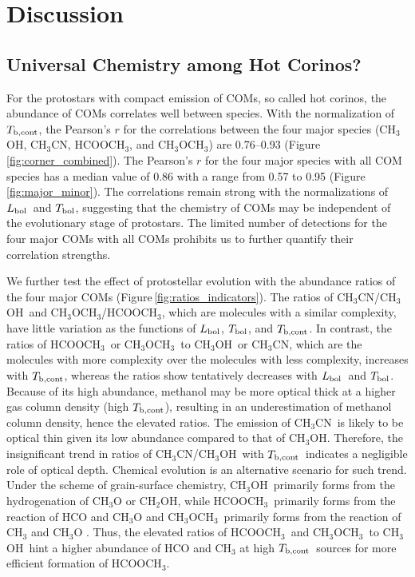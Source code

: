 \documentclass[twocolumn]{aastex62}
\newcommand{\lbol}{\mbox{$L_{\rm bol}$}}
\newcommand{\tbol}{\mbox{$T_{\rm bol}$}}
\newcommand{\tbc}{\mbox{$T_{\rm b, cont}$}}
\newcommand{\methylformate}{\mbox{HCOOCH$_{3}$}}
\newcommand{\methanol}{\mbox{CH$_{3}$OH}}
\newcommand{\dimethylether}{\mbox{CH$_{3}$OCH$_{3}$}}
\newcommand{\methylcyanide}{\mbox{CH$_{3}$CN}}
\begin{document}
\section{Discussion}
\label{sec:discussion}
\subsection{Universal Chemistry among Hot Corinos?}
For the protostars with compact emission of COMs, so called hot corinos, the abundance of COMs correlates well between species.  With the normalization of \tbc, the Pearson's $r$ for the correlations between the four major species (\methanol, \methylcyanide, \methylformate, and \dimethylether) are 0.76--0.93 (Figure\,\ref{fig:corner_combined}).  The Pearson's $r$ for the four major species with all COM species has a median value of 0.86 with a range from 0.57 to 0.95 (Figure\,\ref{fig:major_minor}).  The correlations remain strong with the normalizations of \lbol\ and \tbol, suggesting that the chemistry of COMs may be independent of the evolutionary stage of protostars.  The limited number of detections for the four major COMs with all COMs prohibits us to further quantify their correlation strengths.

We further test the effect of protostellar evolution with the abundance ratios of the four major COMs (Figure\,\ref{fig:ratios_indicators}).  The ratios of \methylcyanide/\methanol\ and \dimethylether/\methylformate, which are molecules with a similar complexity, have little variation as the functions of \lbol, \tbol, and \tbc.  In contrast, the ratios of \methylformate\ or \dimethylether\ to \methanol\ or \methylcyanide, which are the molecules with more complexity over the molecules with less complexity, increases with \tbc, whereas the ratios show tentatively decreases with \lbol\ and \tbol.  Because of its high abundance, methanol may be more optical thick at a higher gas column density (high \tbc), resulting in an underestimation of methanol column density, hence the elevated ratios.  The emission of \methylcyanide\ is likely to be optical thin given its low abundance compared to that of \methanol.  Therefore, the insignificant trend in ratios of \methylcyanide/\methanol\ with \tbc\ indicates a negligible role of optical depth.  Chemical evolution is an alternative scenario for such trend.  Under the scheme of grain-surface chemistry, \methanol\ primarily forms from the hydrogenation of CH$_3$O or CH$_2$OH, while \methylformate\ primarily forms from the reaction of HCO and CH$_3$O and \dimethylether\ primarily forms from the reaction of CH$_3$ and CH$_3$O \citep{2008ApJ...682..283G}.  Thus, the elevated ratios of \methylformate\ and \dimethylether\ to \methanol\ hint a higher abundance of HCO and CH$_3$ at high \tbc\ sources for more efficient formation of \methylformate.
\end{document}
